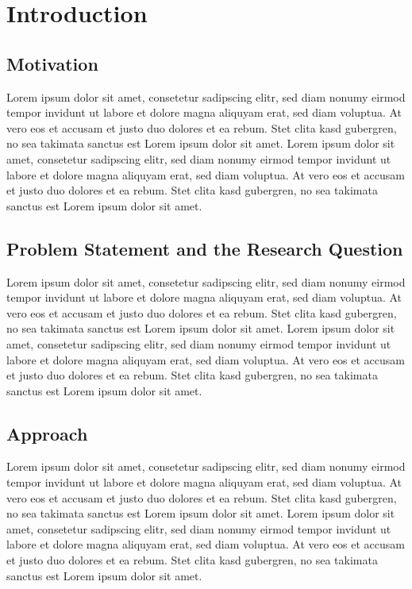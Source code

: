 \documentclass[11pt,oneside,a4paper]{book}
\begin{document}
{
  \hypersetup{linkcolor=black}
  \tableofcontents
}


\chapter{Introduction}


\section{Motivation}
Lorem ipsum dolor sit amet, consetetur sadipscing elitr, sed diam nonumy eirmod tempor invidunt ut labore et dolore magna aliquyam erat, sed diam voluptua. At vero eos et accusam et justo duo dolores et ea rebum. Stet clita kasd gubergren, no sea takimata sanctus est Lorem ipsum dolor sit amet. Lorem ipsum dolor sit amet, consetetur sadipscing elitr, sed diam nonumy eirmod tempor invidunt ut labore et dolore magna aliquyam erat, sed diam voluptua. At vero eos et accusam et justo duo dolores et ea rebum. Stet clita kasd gubergren, no sea takimata sanctus est Lorem ipsum dolor sit amet.



\section{Problem Statement and the Research Question}
Lorem ipsum dolor sit amet, consetetur sadipscing elitr, sed diam nonumy eirmod tempor invidunt ut labore et dolore magna aliquyam erat, sed diam voluptua. At vero eos et accusam et justo duo dolores et ea rebum. Stet clita kasd gubergren, no sea takimata sanctus est Lorem ipsum dolor sit amet. Lorem ipsum dolor sit amet, consetetur sadipscing elitr, sed diam nonumy eirmod tempor invidunt ut labore et dolore magna aliquyam erat, sed diam voluptua. At vero eos et accusam et justo duo dolores et ea rebum. Stet clita kasd gubergren, no sea takimata sanctus est Lorem ipsum dolor sit amet.


\section{Approach}
Lorem ipsum dolor sit amet, consetetur sadipscing elitr, sed diam nonumy eirmod tempor invidunt ut labore et dolore magna aliquyam erat, sed diam voluptua. At vero eos et accusam et justo duo dolores et ea rebum. Stet clita kasd gubergren, no sea takimata sanctus est Lorem ipsum dolor sit amet. Lorem ipsum dolor sit amet, consetetur sadipscing elitr, sed diam nonumy eirmod tempor invidunt ut labore et dolore magna aliquyam erat, sed diam voluptua. At vero eos et accusam et justo duo dolores et ea rebum. Stet clita kasd gubergren, no sea takimata sanctus est Lorem ipsum dolor sit amet.
\end{document}
